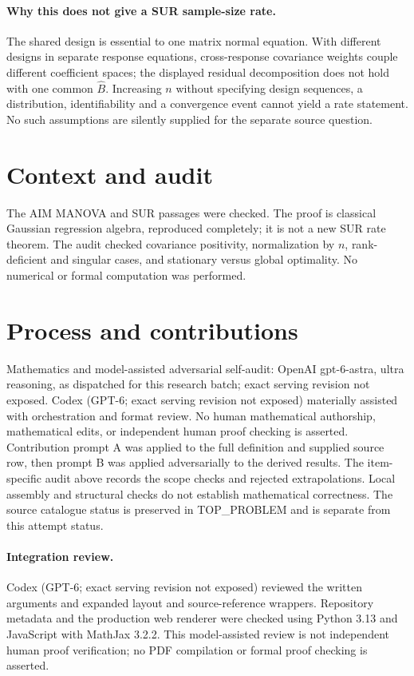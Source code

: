 \documentclass[11pt]{article}
\begin{document}
\paragraph{Why this does not give a SUR sample-size rate.}
The shared design is essential to one matrix normal equation. With
different designs in separate response equations, cross-response
covariance weights couple different coefficient spaces; the displayed
residual decomposition does not hold with one common $\widehat B$.
Increasing $n$ without specifying design sequences, a distribution,
identifiability and a convergence event cannot yield a rate statement.
No such assumptions are silently supplied for the separate source question.

\section{Context and audit}
The AIM MANOVA and SUR passages were checked. The proof is classical
Gaussian regression algebra, reproduced completely; it is not a new SUR
rate theorem. The audit checked covariance positivity, normalization by
$n$, rank-deficient and singular cases, and stationary versus global
optimality. No numerical or formal computation was performed.

\section{Process and contributions}
Mathematics and model-assisted adversarial self-audit: OpenAI gpt-6-astra, ultra reasoning, as dispatched for this research batch; exact serving revision not exposed. Codex (GPT-6; exact serving revision not exposed) materially assisted with orchestration and format review. No human mathematical authorship, mathematical edits, or independent human proof checking is asserted.
Contribution prompt A was applied to the full definition and supplied source row, then prompt B was applied adversarially to the derived results. The item-specific audit above records the scope checks and rejected extrapolations. Local assembly and structural checks do not establish mathematical correctness. The source catalogue status is preserved in TOP\_PROBLEM and is separate from this attempt status.
\paragraph{Integration review.} Codex (GPT-6; exact serving revision not exposed) reviewed the written arguments and expanded layout and source-reference wrappers. Repository metadata and the production web renderer were checked using Python 3.13 and JavaScript with MathJax 3.2.2. This model-assisted review is not independent human proof verification; no PDF compilation or formal proof checking is asserted.
\end{document}
